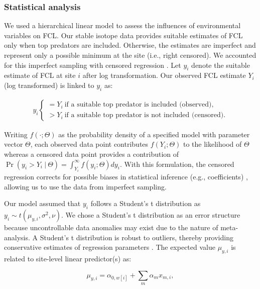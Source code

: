 \documentclass[11pt, class=article, crop=false]{standalone}
\begin{document}
\subsubsection{Statistical analysis}

We used a hierarchical linear model to assess the influences of environmental variables on FCL.
Our stable isotope data provides suitable estimates of FCL only when top predators are included.
Otherwise, the estimates are imperfect and represent only a possible minimum at the site (i.e., right censored).
We accounted for this imperfect sampling with censored regression \citep{terui_stream_2018, lunn_bugs_2012}.
Let $y_i$ denote the suitable estimate of FCL at site $i$ after log transformation.
Our observed FCL estimate $Y_i$ (log transformed) is linked to $y_i$ as:

\begin{align}
    y_i 
    \begin{cases}
        = Y_i~\text{if a suitable top predator is included (observed)},\\
        > Y_i~\text{if a suitable top predator is not included (censored).}
    \end{cases}
\end{align}

Writing $f(\cdot;\Theta)$ as the probability density of a specified model with parameter vector $\Theta$, each observed data point contributes $f(Y_i;\Theta)$ to the likelihood of $\Theta$ whereas a censored data point provides a contribution of $\Pr(y_i > Y_i~|~\Theta) = \int_{Y_i}^{\infty} f(y_i;\Theta) dy_i$.
With this formulation, the censored regression corrects for possible biases in statistical inference (e.g., coefficients) \citep{terui_stream_2018, lunn_bugs_2012}, allowing us to use the data from imperfect sampling.

Our model assumed that $y_i$ follows a Student's t distribution as $y_i \sim t(\mu_{y,i}, \sigma^2, \nu)$.
We chose a Student's t distribution as an error structure because uncontrollable data anomalies may exist due to the nature of meta-analysis.
A Student's t distribution is robust to outliers, thereby providing conservative estimates of regression parameters \citep{lunn_bugs_2012}.
The expected value $\mu_{y,i}$ is related to site-level linear predictor(s) as:

\begin{equation}
    \mu_{y,i} = \alpha_{0, w[i]} + \sum_m \alpha_m x_{m,i},
\end{equation}
\end{document}
